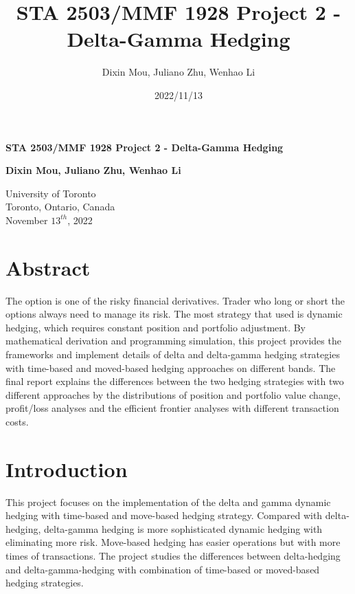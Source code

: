 \documentclass[12pt]{article}
\title{STA 2503/MMF 1928 Project 2 - Delta-Gamma Hedging}
\author{Dixin Mou, Juliano Zhu, Wenhao Li}
\date{2022/11/13}
\begin{document}
\begin{titlepage}
  \begin{center}
      \vspace*{7cm}

      \textbf{STA 2503/MMF 1928 Project 2 - Delta-Gamma Hedging}

           
      \vspace{1.5cm}

      \textbf{Dixin Mou, Juliano Zhu, Wenhao Li}

      \vfill
           
           
      \vspace{0.8cm}
           
      University of Toronto\\
      Toronto, Ontario, Canada\\
      November $13^{th}$, 2022 
           
  \end{center}
\end{titlepage}


\section{Abstract}
The option is one of the risky financial derivatives. Trader who long or short the options always need to manage its risk. The most strategy that used is dynamic hedging, which requires constant position and portfolio adjustment. By mathematical 
derivation and programming simulation, this project provides the frameworks and implement details of delta and delta-gamma hedging strategies with time-based and moved-based hedging approaches on different bands. The final report explains the 
differences between the two hedging strategies with two different approaches by the distributions of position and portfolio value change, profit/loss analyses and the efficient frontier analyses with different transaction costs.

\newpage
\tableofcontents

\newpage
\listoffigures

\newpage
\section{Introduction}
This project focuses on the implementation of the delta and gamma dynamic hedging with time-based and move-based hedging strategy. Compared with delta-hedging, delta-gamma hedging is more sophisticated dynamic hedging with eliminating more risk. 
Move-based hedging has easier operations but with more times of transactions. The project studies the differences between delta-hedging and delta-gamma-hedging with combination of time-based or moved-based hedging strategies.
\end{document}
